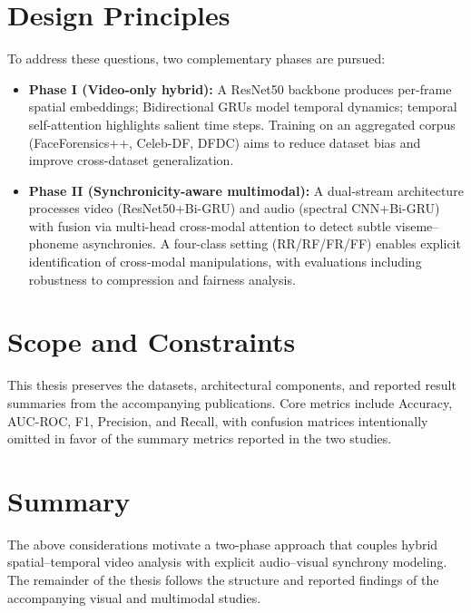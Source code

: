 \section{Design Principles}
To address these questions, two complementary phases are pursued:
\begin{itemize}
    \item \textbf{Phase I (Video-only hybrid):} A ResNet50 backbone produces per-frame spatial embeddings; Bidirectional GRUs model temporal dynamics; temporal self-attention highlights salient time steps. Training on an aggregated corpus (FaceForensics++, Celeb-DF, DFDC) aims to reduce dataset bias and improve cross-dataset generalization.
    \item \textbf{Phase II (Synchronicity-aware multimodal):} A dual-stream architecture processes video (ResNet50+Bi-GRU) and audio (spectral CNN+Bi-GRU) with fusion via multi-head cross-modal attention to detect subtle viseme–phoneme asynchronies. A four-class setting (RR/RF/FR/FF) enables explicit identification of cross-modal manipulations, with evaluations including robustness to compression and fairness analysis.
\end{itemize}

\section{Scope and Constraints}
This thesis preserves the datasets, architectural components, and reported result summaries from the accompanying publications. Core metrics include Accuracy, AUC-ROC, F1, Precision, and Recall, with confusion matrices intentionally omitted in favor of the summary metrics reported in the two studies.

\section{Summary}
The above considerations motivate a two-phase approach that couples hybrid spatial–temporal video analysis with explicit audio–visual synchrony modeling. The remainder of the thesis follows the structure and reported findings of the accompanying visual and multimodal studies.